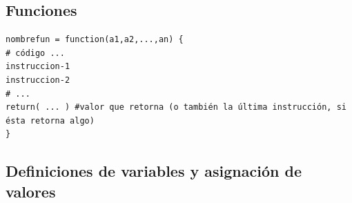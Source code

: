 \documentclass[12pt]{article}
\begin{document}
\subsection{Funciones}

\begin{verbatim}
nombrefun = function(a1,a2,...,an) {
# código ...
instruccion-1
instruccion-2
# ...
return( ... ) #valor que retorna (o también la última instrucción, si ésta retorna algo)
}
\end{verbatim}

\subsection{Definiciones de variables y asignación de valores}
\end{document}
